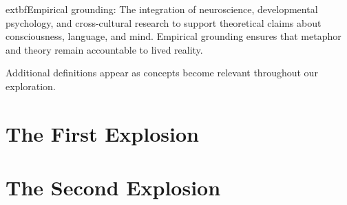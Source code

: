 \documentclass[12pt,letterpaper]{book}
\begin{document}
	extbf{Empirical grounding}: The integration of neuroscience, developmental psychology, and cross-cultural research to support theoretical claims about consciousness, language, and mind. Empirical grounding ensures that metaphor and theory remain accountable to lived reality.

Additional definitions appear as concepts become relevant throughout our exploration.

\part{The First Explosion}

\fancyhead[LO]{}

















\part{The Second Explosion}























\printbibliography
\end{document}
